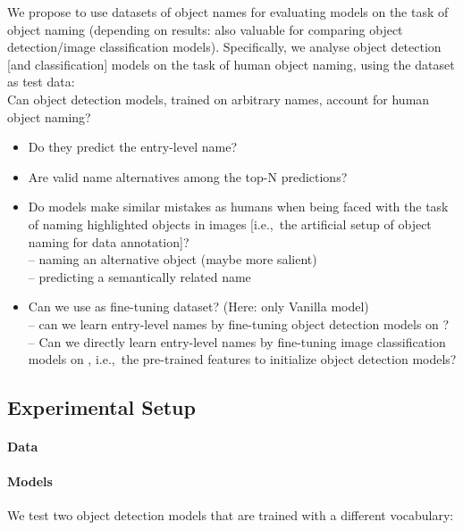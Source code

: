 We propose to use datasets of object names for evaluating models on the task of object naming (depending on results: also valuable for comparing object detection/image classification models).
Specifically, we analyse object detection [and classification] models on the task of human object naming, using the \mn dataset as test data:\\
Can object detection models, trained on arbitrary names, account for human object naming?
\begin{itemize}
	\item Do they predict the entry-level name?
	\item Are valid name alternatives among the top-N predictions?
	\item Do models make similar mistakes as humans when being faced with the task of naming highlighted objects in images [i.e.,\ the artificial setup of object naming for data annotation]?\\
	-- naming an alternative object (maybe more salient)\\
	-- predicting a semantically related name
	\item Can we use \mn as fine-tuning dataset? (Here: only Vanilla model)\\
	-- can we learn entry-level names by fine-tuning object detection models on \mn?\\
	-- Can we directly learn entry-level names by fine-tuning image classification models on \mn, i.e.,\ the pre-trained features to initialize object detection models?
\end{itemize}

\subsection{Experimental Setup}
\label{sect:exp_setup}

\paragraph{Data}

\paragraph{Models}

We test two object detection models that are trained with a different vocabulary:


